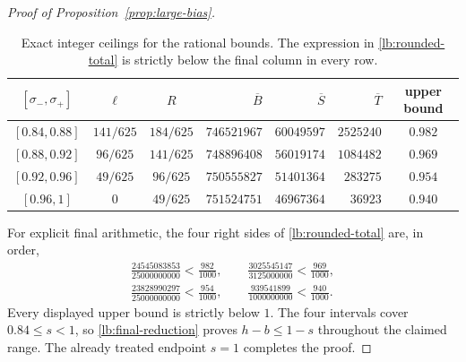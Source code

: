 \begin{proof}[Proof of Proposition~\ref{prop:large-bias}]
\begin{table}[htbp]
 \centering
 \small
 \setlength{\tabcolsep}{4pt}
 \begin{tabular}{@{}cccrrrc@{}}
  \toprule
  $[\sigma_-,\sigma_+]$ & $\ell$ & $R$
  & $\overline B$ & $\overline S$ & $\overline T$ & upper bound\\
  \midrule
  $[0.84,0.88]$ & $141/625$ & $184/625$ &
  $746521967$ & $60049597$ & $2525240$ & $0.982$\\
  $[0.88,0.92]$ & $96/625$ & $141/625$ &
  $748896408$ & $56019174$ & $1084482$ & $0.969$\\
  $[0.92,0.96]$ & $49/625$ & $96/625$ &
  $750555827$ & $51401364$ & $283275$ & $0.954$\\
  $[0.96,1]$ & $0$ & $49/625$ &
  $751524751$ & $46967364$ & $36923$ & $0.940$\\
  \bottomrule
 \end{tabular}
 \caption{Exact integer ceilings for the rational bounds. The expression
 in \eqref{lb:rounded-total} is strictly below the final column in every
 row.}
 \label{lb:arithmetic-table}
\end{table}

For explicit final arithmetic, the four right sides of
\eqref{lb:rounded-total} are, in order,
\begin{gather*}
 \frac{24545083853}{25000000000}<\frac{982}{1000},\qquad
 \frac{3025545147}{3125000000}<\frac{969}{1000},\\
 \frac{23828990297}{25000000000}<\frac{954}{1000},\qquad
 \frac{939541899}{1000000000}<\frac{940}{1000}.
\end{gather*}
Every displayed upper bound is strictly below $1$.
The four intervals cover $0.84\le s<1$, so
\eqref{lb:final-reduction} proves $h-b\le1-s$ throughout the claimed
range. The already treated endpoint $s=1$ completes the proof.
\end{proof}
